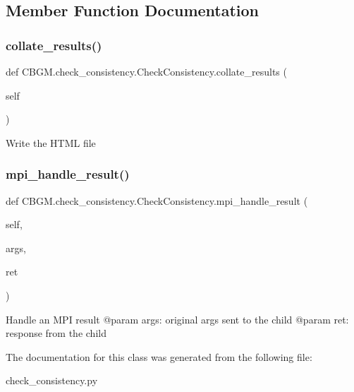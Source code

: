 \subsection{Member Function Documentation}
\mbox{\label{classCBGM_1_1check__consistency_1_1CheckConsistency_a7f800c25db68d0c3af20fdd478eb749d}} 
\subsubsection{\texorpdfstring{collate\+\_\+results()}{collate\_results()}}
{\footnotesize\ttfamily def C\+B\+G\+M.\+check\+\_\+consistency.\+Check\+Consistency.\+collate\+\_\+results (\begin{DoxyParamCaption}\item[{}]{self }\end{DoxyParamCaption})}

\begin{DoxyVerb}Write the HTML file
\end{DoxyVerb}
 \mbox{\label{classCBGM_1_1check__consistency_1_1CheckConsistency_a7264e4aabf713a19c984a4da92fa42fb}} 
\subsubsection{\texorpdfstring{mpi\+\_\+handle\+\_\+result()}{mpi\_handle\_result()}}
{\footnotesize\ttfamily def C\+B\+G\+M.\+check\+\_\+consistency.\+Check\+Consistency.\+mpi\+\_\+handle\+\_\+result (\begin{DoxyParamCaption}\item[{}]{self,  }\item[{}]{args,  }\item[{}]{ret }\end{DoxyParamCaption})}

\begin{DoxyVerb}Handle an MPI result
@param args: original args sent to the child
@param ret: response from the child
\end{DoxyVerb}
 

The documentation for this class was generated from the following file\+:\begin{DoxyCompactItemize}
\item 
check\+\_\+consistency.\+py\end{DoxyCompactItemize}
